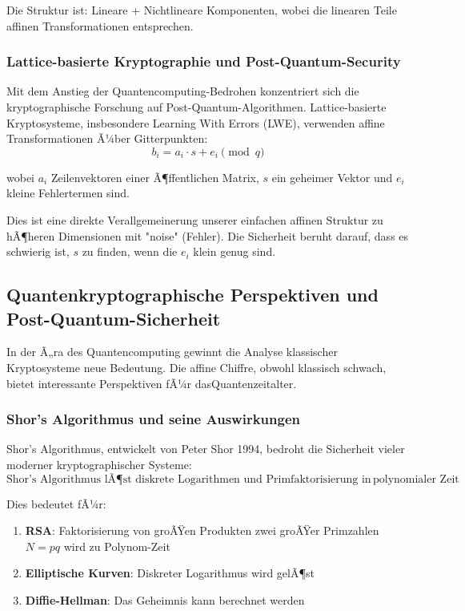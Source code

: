 ﻿\documentclass[12pt,a4paper]{article}
\begin{document}
	Die Struktur ist: Lineare + Nichtlineare Komponenten, wobei die linearen Teile affinen Transformationen entsprechen.
	
	\subsubsection{Lattice-basierte Kryptographie und Post-Quantum-Security}
	
	Mit dem Anstieg der Quantencomputing-Bedrohen konzentriert sich die kryptographische Forschung auf Post-Quantum-Algorithmen. Lattice-basierte Kryptosysteme, insbesondere Learning With Errors (LWE), verwenden affine Transformationen Ã¼ber Gitterpunkten:
	\begin{equation}
		b_i = a_i \cdot s + e_i \pmod{q}
	\end{equation}
	
	wobei $a_i$ Zeilenvektoren einer Ã¶ffentlichen Matrix, $s$ ein geheimer Vektor und $e_i$ kleine Fehlertermen sind.
	
	Dies ist eine direkte Verallgemeinerung unserer einfachen affinen Struktur zu hÃ¶heren Dimensionen mit "noise" (Fehler). Die Sicherheit beruht darauf, dass es schwierig ist, $s$ zu finden, wenn die $e_i$ klein genug sind.
	
	
	\subsection{Quantenkryptographische Perspektiven und Post-Quantum-Sicherheit}
	
	In der Ã„ra des Quantencomputing gewinnt die Analyse klassischer Kryptosysteme neue Bedeutung. Die affine Chiffre, obwohl klassisch schwach, bietet interessante Perspektiven fÃ¼r dasQuantenzeitalter.
	
	\subsubsection{Shor's Algorithmus und seine Auswirkungen}
	
	Shor's Algorithmus, entwickelt von Peter Shor 1994, bedroht die Sicherheit vieler moderner kryptographischer Systeme:
	\begin{equation}
		\text{Shor's Algorithmus lÃ¶st diskrete Logarithmen und Primfaktorisierung in} \, \text{polynomialer Zeit}
	\end{equation}
	
	Dies bedeutet fÃ¼r:
	\begin{enumerate}
		\item \textbf{RSA}: Faktorisierung von groÃŸen Produkten zwei groÃŸer Primzahlen $N = pq$ wird zu Polynom-Zeit
		\item \textbf{Elliptische Kurven}: Diskreter Logarithmus wird gelÃ¶st
		\item \textbf{Diffie-Hellman}: Das Geheimnis kann berechnet werden
	\end{enumerate}
	
\end{document}
